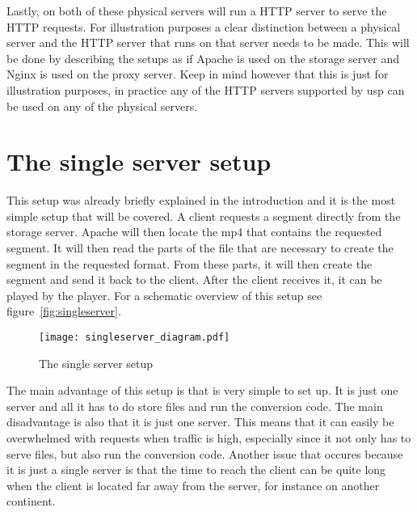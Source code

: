 \documentclass[twoside,openright]{uva-bachelor-thesis}
\begin{document}
Lastly, on both of these physical servers will run a HTTP server to serve the
HTTP requests. For illustration purposes a clear distinction between a
physical server and the HTTP server that runs on that server needs to be made.
This will be done by describing the setups as if Apache is used on the storage
server and Nginx is used on the proxy server. Keep in mind however that this is
just for illustration purposes, in practice any of the HTTP servers supported by
\gls{usp} can be used on any of the physical servers.


\section{The single server setup}
This setup was already briefly explained in the introduction and it is the most
simple setup that will be covered. A client requests a segment directly from the
storage server. Apache will then locate the mp4 that contains the requested
segment. It will then read the parts of the file that are necessary to create
the segment in the requested format. From these parts, it will then create the
segment and send it back to the client. After the client receives it, it can be
played by the player. For a schematic overview of this setup see
figure~\vref{fig:singleserver}.

\begin{figure}[h]
    \texttt{[image: singleserver\_diagram.pdf]}
    \caption{The single server setup}\label{fig:singleserver}
\end{figure}

The main advantage of this setup is that is very simple to set up. It is just
one server and all it has to do store files and run the conversion code. The
main disadvantage is also that it is just one server. This means that it can
easily be overwhelmed with requests when traffic is high, especially since it
not only has to serve files, but also run the conversion code. Another issue
that occures because it is just a single server is that the time to reach the
client can be quite long when the client is located far away from the server,
for instance on another continent.

\end{document}

